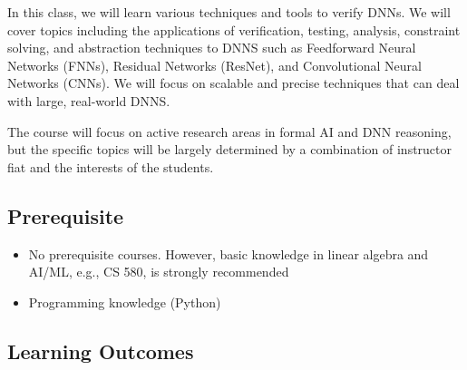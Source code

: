 \documentclass[11pt]{article}
\begin{document}
In this class, we will learn various techniques and tools to verify DNNs. We will cover topics including the applications
of verification, testing, analysis, constraint solving, and abstraction
techniques to DNNS such as Feedforward Neural Networks
(FNNs), Residual Networks (ResNet), and Convolutional Neural Networks
(CNNs). We will focus on scalable and precise techniques that can deal with large, real-world DNNS.

The course will focus on active research areas in formal AI and DNN reasoning,
but the specific topics will be largely determined by a
combination of instructor fiat and the interests of the students.



\subsection{Prerequisite}
\begin{itemize}
\item No prerequisite courses. However, basic knowledge in linear algebra and AI/ML, e.g., CS 580, is strongly recommended
\item Programming knowledge (Python)
\end{itemize}



\subsection{Learning Outcomes}
\end{document}
